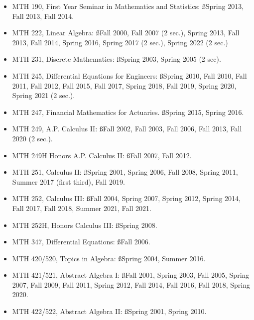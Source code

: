 \documentclass[overlapped,line,letterpaper]{res}
\begin{document}
\begin{resume}
\begin{itemize}
\item
MTH 190, First Year Seminar in Mathematics and Statistics: {\ss Spring 2013, 
Fall 2013, Fall 2014.}

\item
MTH 222, Linear Algebra: {\ss Fall 2000, Fall 2007 (2 sec.), Spring 2013, Fall 
2013, Fall 2014, Spring 2016, Spring 2017 (2 sec.), Spring 2022 (2 sec.)}

\item
MTH 231, Discrete Mathematics: {\ss Spring 2003, Spring 2005 (2 sec).}

\item
MTH 245, Differential Equations for Engineers: {\ss Spring 2010, Fall 2010, Fall 
2011, Fall 2012, Fall 2015, Fall 2017, Spring 2018, Fall 2019, Spring 2020, Spring 2021 (2 sec.).}

\item
MTH 247, Financial Mathematics for Actuaries.  {\ss Spring 2015, Spring 2016.}


\item
MTH 249, A.P. Calculus II: {\ss Fall 2002, Fall 2003, Fall 2006, Fall 2013, Fall 2020 (2 sec.).}

\item
MTH 249H Honors A.P. Calculus II: {\ss Fall 2007, Fall 2012.}

\item
MTH 251, Calculus II: {\ss Spring 2001, Spring 2006, Fall 2008, Spring 2011, Summer 2017 (first third), Fall 2019.}

\item
MTH 252, Calculus III: {\ss Fall 2004, Spring 2007, Spring 2012, Spring 2014, Fall 2017, Fall 2018, Summer 2021, Fall 2021.}

\item
MTH 252H, Honors Calculus III: {\ss Spring 2008.}

\item
MTH 347, Differential Equations: {\ss Fall 2006.}

\item
MTH 420/520, Topics in Algebra: {\ss Spring 2004, Summer 2016.}

\item
MTH 421/521, Abstract Algebra I: {\ss Fall 2001, Spring 2003, Fall 2005, Spring
2007, Fall 2009, Fall 2011, Spring 2012, Fall 2014, Fall 2016, Fall 2018, Spring 2020.}

\item
MTH 422/522, Abstract Algebra II: {\ss Spring 2001, Spring 2010.}


\end{itemize}
\end{resume}
\end{document}
